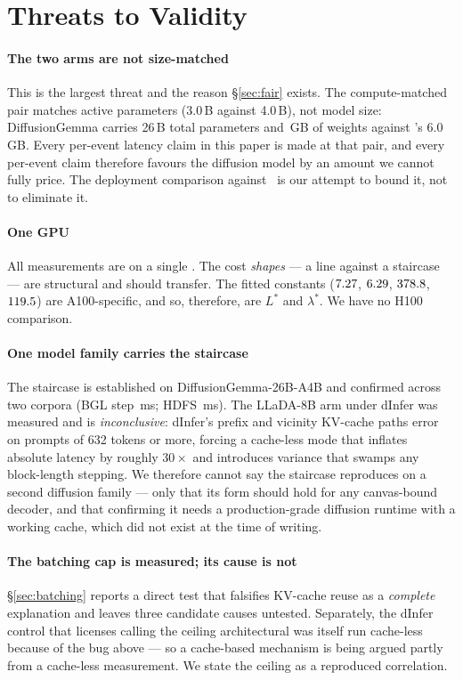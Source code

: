\section{Threats to Validity}
\label{sec:threats}

\paragraph{The two arms are not size-matched}
This is the largest threat and the reason \S\ref{sec:fair} exists. The
compute-matched pair matches active parameters (3.0\,B against 4.0\,B), not
model size: DiffusionGemma carries 26\,B total parameters and \dgWeights\,GB
of weights against \ARthree's 6.0\,GB. Every per-event latency claim in this
paper is made at that pair, and every per-event claim therefore favours the
diffusion model by an amount we cannot fully price. The deployment comparison
against \ARoneb\ is our attempt to bound it, not to eliminate it.

\paragraph{One GPU}
All measurements are on a single \gpuModel. The cost \emph{shapes} --- a line
against a staircase --- are structural and should transfer. The fitted
constants ($7.27$, $6.29$, $378.8$, $119.5$) are A100-specific, and
so, therefore, are $L^{*}$ and $\lambda^{*}$. We have no H100 comparison.

\paragraph{One model family carries the staircase}
The staircase is established on DiffusionGemma-26B-A4B and confirmed across
two corpora (BGL step \bglStep\,ms; HDFS \hdfsStep\,ms). The LLaDA-8B arm
under dInfer was measured and is \emph{inconclusive}: dInfer's prefix and
vicinity KV-cache paths error on prompts of 632 tokens or more, forcing a
cache-less mode that inflates absolute latency by roughly $30\times$ and
introduces variance that swamps any block-length stepping. We therefore cannot
say the staircase reproduces on a second diffusion family --- only that its
form should hold for any canvas-bound decoder, and that confirming it needs a
production-grade diffusion runtime with a working cache, which did not exist
at the time of writing.

\paragraph{The batching cap is measured; its cause is not}
\S\ref{sec:batching} reports a direct test that falsifies KV-cache reuse as a
\emph{complete} explanation and leaves three candidate causes untested.
Separately, the dInfer control that licenses calling the ceiling
architectural was itself run cache-less because of the bug above --- so a
cache-based mechanism is being argued partly from a cache-less measurement.
We state the ceiling as a reproduced correlation.

